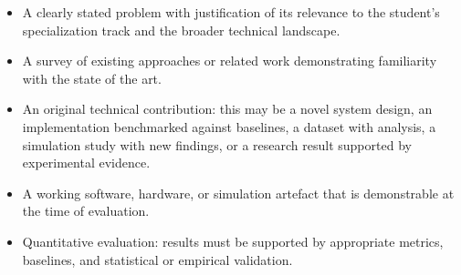 \begin{itemize}
    \item A clearly stated problem with justification of its relevance to the student's specialization track and the broader technical landscape.
    \item A survey of existing approaches or related work demonstrating familiarity with the state of the art.
    \item An original technical contribution: this may be a novel system design, an implementation benchmarked against baselines, a dataset with analysis, a simulation study with new findings, or a research result supported by experimental evidence.
    \item A working software, hardware, or simulation artefact that is demonstrable at the time of evaluation.
    \item Quantitative evaluation: results must be supported by appropriate metrics, baselines, and statistical or empirical validation.
\end{itemize}

\newpage
{}